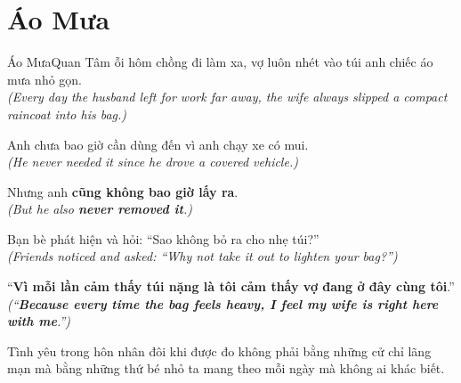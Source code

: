 \section{Áo Mưa}
\begin{truyen}{Áo Mưa}{Quan Tâm}
ỗi hôm chồng đi làm xa, vợ luôn nhét vào túi anh chiếc áo mưa nhỏ gọn.\\
\textit{(Every day the husband left for work far away, the wife always slipped a compact raincoat into his bag.)}

Anh chưa bao giờ cần dùng đến vì anh chạy xe có mui.\\
\textit{(He never needed it since he drove a covered vehicle.)}

Nhưng anh \textbf{cũng không bao giờ lấy ra}.\\
\textit{(But he also \textbf{never removed it}.)}

Bạn bè phát hiện và hỏi: ``Sao không bỏ ra cho nhẹ túi?''\\
\textit{(Friends noticed and asked: ``Why not take it out to lighten your bag?'')}

``\textbf{Vì mỗi lần cảm thấy túi nặng là tôi cảm thấy vợ đang ở đây cùng tôi}.''\\
\textit{(``\textbf{Because every time the bag feels heavy, I feel my wife is right here with me}.'')}
\end{truyen}
\begin{baihoc}
  Tình yêu trong hôn nhân đôi khi được đo không phải bằng những cử chỉ lãng mạn mà bằng những thứ bé nhỏ ta mang theo mỗi ngày mà không ai khác biết.
\end{baihoc}

